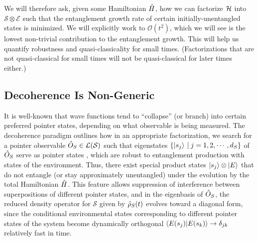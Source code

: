 \documentclass[aps,pra,onecolumn,nofootinbib,notitlepage,11pt,tightenlines]{revtex4-1}
\begin{document}
We will therefore ask, given some Hamiltonian $\hat{H}$, how we can factorize $\mathcal{H}$ into $ \mathcal{S} \otimes \mathcal{E}$ such that the entanglement growth rate of certain initially-unentangled states is minimized.
We will explicitly work to $\mathcal{O}(t^2)$, which we will see is the lowest non-trivial contribution to the entanglement growth. This will help us quantify robustness and quasi-classicality for small times. (Factorizations that are not quasi-classical for small times will not be quasi-classical for later times either.)
 
\subsection{Decoherence Is Non-Generic}
\label{sec:decoherence_feature}
 
It is well-known that wave functions tend to ``collapse'' (or branch) into certain preferred pointer states, depending on what observable is being measured. The decoherence paradigm outlines how in an appropriate factorization, we search for a  {pointer observable} $\hat{O}_{S} \in \mathcal{L}(\mathcal{S}) $ such that eigenstates $\{\ket{s_{j}} \: | \: j = 1,2,\cdots,d_{S} \}$ of $\hat{O}_{S}$   serve as  {pointer states} \cite{Zurek:1981xq}, which are robust to entanglement production with states of the environment. Thus, there exist special product states $\ket{s_{j}} \otimes \ket{E}$ that do not entangle (or stay approximately unentangled) under the evolution by the total Hamiltonian $\hat{H}$. This feature allows suppression of interference between superpositions of different pointer states, and in the eigenbasis of $\hat{O}_{S}$, the reduced density operator for $\mathcal{S}$ given by $\hat{\rho}_{S}(t)$ evolves toward a diagonal form, since the conditional environmental states corresponding to different pointer states of the system become  {dynamically} orthogonal $\braket{E(s_j)|E(s_{k})} \to \delta_{jk}$ relatively fast in time. 
\end{document}
